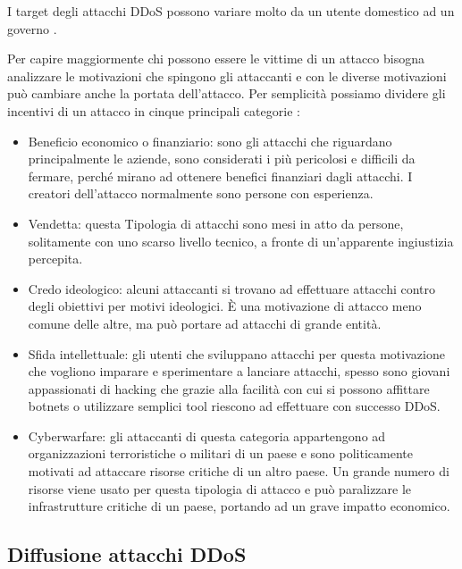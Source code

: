 I target degli attacchi DDoS possono variare molto da un utente domestico ad un governo \cite{ddos_motivations}.


Per capire maggiormente chi possono essere le vittime di un attacco bisogna analizzare le motivazioni che spingono gli attaccanti e con le diverse motivazioni può cambiare anche la portata dell'attacco. Per semplicità possiamo dividere gli incentivi di un attacco in cinque principali categorie \cite{ddos_survey_1}\cite{ddos_motivations}:

\begin{itemize}
    \item Beneficio economico o finanziario: sono gli attacchi che riguardano principalmente le aziende, sono considerati i più pericolosi e difficili da fermare, perché mirano ad ottenere benefici finanziari dagli attacchi. I creatori dell'attacco normalmente sono persone con esperienza.
    \item Vendetta: questa Tipologia di attacchi sono mesi in atto da persone, solitamente con uno scarso livello tecnico, a fronte di un'apparente ingiustizia percepita.
    \item Credo ideologico: alcuni attaccanti si trovano ad effettuare attacchi contro degli obiettivi per motivi ideologici. È una motivazione di attacco meno comune delle altre, ma può portare ad attacchi di grande entità. %
    \item Sfida intellettuale: gli utenti che sviluppano attacchi per questa motivazione che vogliono imparare e sperimentare a lanciare attacchi, spesso sono giovani appassionati di hacking che grazie alla facilità con cui si possono affittare botnets o utilizzare semplici tool riescono ad effettuare con successo DDoS.
    \item Cyberwarfare: gli attaccanti di questa categoria appartengono ad organizzazioni terroristiche o militari di un paese e sono politicamente motivati ad attaccare risorse critiche di un altro paese. Un grande numero di risorse viene usato per questa tipologia di attacco e può paralizzare le infrastrutture critiche di un paese, portando ad un grave impatto economico.
\end{itemize}


\subsection{Diffusione attacchi DDoS}

